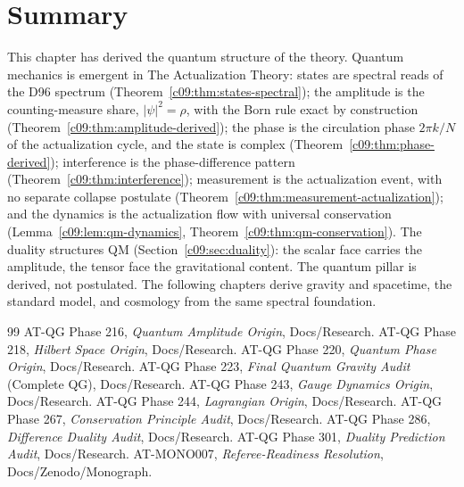 \section{Summary}
\label{c09:sec:qm-summary}

This chapter has derived the quantum structure of the theory. Quantum mechanics is
emergent in The Actualization Theory: states are spectral reads of the D96 spectrum
(Theorem~\ref{c09:thm:states-spectral}); the amplitude is the counting-measure share,
$|\psi|^2 = \rho$, with the Born rule exact by construction
(Theorem~\ref{c09:thm:amplitude-derived}); the phase is the circulation phase $2\pi k/N$ of
the actualization cycle, and the state is complex (Theorem~\ref{c09:thm:phase-derived});
interference is the phase-difference pattern (Theorem~\ref{c09:thm:interference});
measurement is the actualization event, with no separate collapse postulate
(Theorem~\ref{c09:thm:measurement-actualization}); and the dynamics is the actualization flow
with universal conservation (Lemma~\ref{c09:lem:qm-dynamics},
Theorem~\ref{c09:thm:qm-conservation}). The duality structures QM
(Section~\ref{c09:sec:duality}): the scalar face carries the amplitude, the tensor face the
gravitational content. The quantum pillar is derived, not postulated. The following
chapters derive gravity and spacetime, the standard model, and cosmology from the same
spectral foundation.

\begin{thebibliography}{99}
 AT-QG Phase 216, \emph{Quantum Amplitude Origin}, Docs/Research.
 AT-QG Phase 218, \emph{Hilbert Space Origin}, Docs/Research.
 AT-QG Phase 220, \emph{Quantum Phase Origin}, Docs/Research.
 AT-QG Phase 223, \emph{Final Quantum Gravity Audit} (Complete QG), Docs/Research.
 AT-QG Phase 243, \emph{Gauge Dynamics Origin}, Docs/Research.
 AT-QG Phase 244, \emph{Lagrangian Origin}, Docs/Research.
 AT-QG Phase 267, \emph{Conservation Principle Audit}, Docs/Research.
 AT-QG Phase 286, \emph{Difference Duality Audit}, Docs/Research.
 AT-QG Phase 301, \emph{Duality Prediction Audit}, Docs/Research.
 AT-MONO007, \emph{Referee-Readiness Resolution}, Docs/Zenodo/Monograph.
\end{thebibliography}

